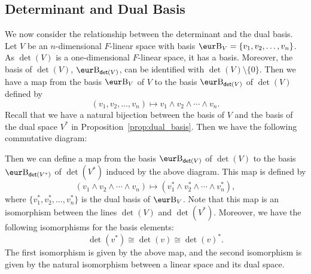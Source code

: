\subsection{Determinant and Dual Basis}
We now consider the relationship between the determinant and the dual basis. Let $V$ be an $n$-dimensional $F$-linear space with basis $\B_V = \{ v_1, v_2, \ldots, v_n \}$. As $\det(V)$ is a one-dimensional $F$-linear space, it has a basis. Moreover, the basis of $\det(V)$, $\B_{\det(V)}$, can be identified with $\det(V) \setminus \{0\}$. Then we have a map from the basis $\B_V$ of $V$ to the basis $\B_{\det(V)}$ of $\det(V)$ defined by
\[
  (v_1, v_2, \ldots, v_n) \mapsto v_1 \wedge v_2 \wedge \cdots \wedge v_n.
\]
Recall that we have a natural bijection between the basis of $V$ and the basis of the dual space $V^*$ in Proposition~\ref{prop:dual_basis}. Then we have the following commutative diagram:
\begin{center}
\end{center}
Then we can define a map from the basis $\B_{\det(V)}$ of $\det(V)$ to the basis $\B_{\det(V^*)}$ of $\det(V^*)$ induced by the above diagram. This map is defined by
\[
  (v_1 \wedge v_2 \wedge \cdots \wedge v_n) \mapsto (v_1^* \wedge v_2^* \wedge \cdots \wedge v_n^*),
\]
where $\{ v_1^*, v_2^*, \ldots, v_n^* \}$ is the dual basis of $\B_V$. Note that this map is an isomorphism between the lines $\det(V)$ and $\det(V^*)$. Moreover, we have the following isomorphisms for the basis elements:
\[
  \det(v^*) \cong \det(v) \cong {\det(v)}^*.
\]
The first isomorphism is given by the above map, and the second isomorphism is given by the natural isomorphism between a linear space and its dual space.

